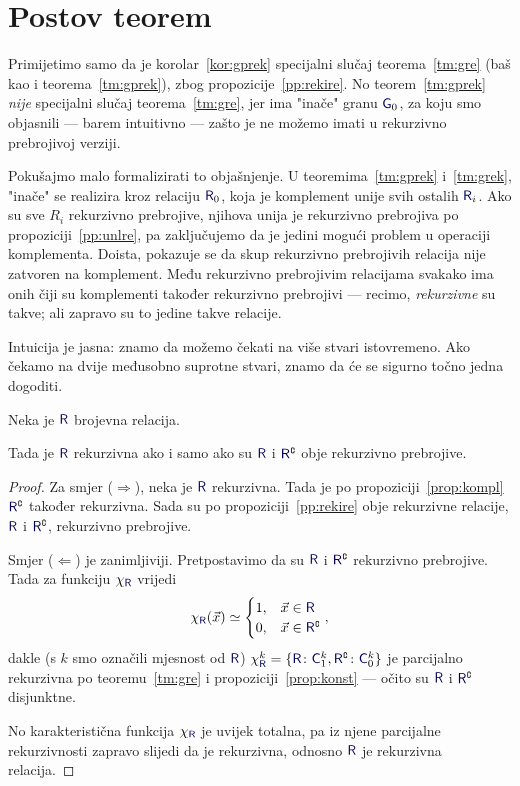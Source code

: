 \section{Postov teorem}\label{sec:Post}

Primijetimo samo da je korolar~\ref{kor:gprek} specijalni slučaj teorema~\ref{tm:gre} (baš kao i teorema~\ref{tm:gprek}), zbog propozicije~\ref{pp:rekire}. No teorem~\ref{tm:gprek} \emph{nije} specijalni slučaj teorema~\ref{tm:gre}, jer ima "inače" granu $\f G_0$, za koju smo objasnili --- barem intuitivno --- zašto je ne možemo imati u rekurzivno prebrojivoj verziji.

Pokušajmo malo formalizirati to objašnjenje. U teoremima~\ref{tm:gprek} i~\ref{tm:grek}, "inače" se realizira kroz relaciju $\f R_0$, koja je komplement unije svih ostalih $\f R_i$. Ako su sve $R_i$ rekurzivno prebrojive, njihova unija je rekurzivno prebrojiva po propoziciji~\ref{pp:unlre}, pa zaključujemo da je jedini mogući problem u operaciji komplementa. Doista, pokazuje se da skup rekurzivno prebrojivih relacija nije zatvoren na komplement. Među rekurzivno prebrojivim relacijama svakako ima onih čiji su komplementi također rekurzivno prebrojivi --- recimo, \emph{rekurzivne} su takve; ali zapravo su to jedine takve relacije.

Intuicija je jasna: znamo da možemo čekati na više stvari istovremeno. Ako čekamo na dvije međusobno suprotne stvari, znamo da će se sigurno točno jedna dogoditi.

\begin{teorem}[Post]\label{tm:Post}
Neka je $\f R$ brojevna relacija.
    
    Tada je $\f R$ rekurzivna ako i samo ako su $\f R$ i $\f R\kompl$ obje rekurzivno prebrojive.
\end{teorem}
\begin{proof}
Za smjer ($\Rightarrow$), neka je $\f R$ rekurzivna. Tada je po propoziciji~\ref{prop:kompl} $\f R\kompl$ također rekurzivna. Sada su po propoziciji~\ref{pp:rekire} obje rekurzivne relacije, $\f R$ i $\f R\kompl$, rekurzivno prebrojive.

Smjer ($\Leftarrow$) je zanimljiviji. Pretpostavimo da su $\f R$ i $\f R\kompl$ rekurzivno prebrojive. Tada za funkciju $\chi_{\f R}$ vrijedi
\begin{equation}
    \chi_{\f R}(\vec x)\simeq\begin{cases}
    1,&\vec x\in\f R\\
    0,&\vec x\in\f R\kompl
    \end{cases}\text,
\end{equation}
dakle (s $k$ smo označili mjesnost od $\f R$) $\chi^k_{\f R}=\{\f R\colon\f C_1^k,\f R\kompl\colon\f C_0^k\}$ je parcijalno rekurzivna po teoremu~\ref{tm:gre} i propoziciji~\ref{prop:konst} --- očito su $\f R$ i $\f R\kompl$ disjunktne.

No karakteristična funkcija $\chi_{\f R}$ je uvijek totalna, pa iz njene parcijalne rekurzivnosti zapravo slijedi da je rekurzivna, odnosno $\f R$ je rekurzivna relacija.
\end{proof}

